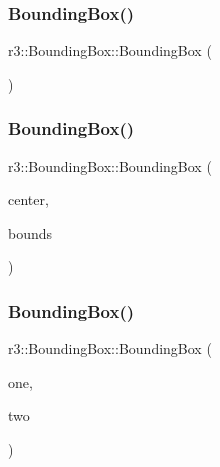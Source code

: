 \subsubsection{\texorpdfstring{Bounding\+Box()}{BoundingBox()}\hspace{0.1cm}{\footnotesize\ttfamily [1/3]}}
{\footnotesize\ttfamily r3\+::\+Bounding\+Box\+::\+Bounding\+Box (\begin{DoxyParamCaption}{ }\end{DoxyParamCaption})}

\mbox{\label{classr3_1_1_bounding_box_abb61e82e1d736772f92b4f5b519c755d}} 
\subsubsection{\texorpdfstring{Bounding\+Box()}{BoundingBox()}\hspace{0.1cm}{\footnotesize\ttfamily [2/3]}}
{\footnotesize\ttfamily r3\+::\+Bounding\+Box\+::\+Bounding\+Box (\begin{DoxyParamCaption}\item[{const glm\+::vec3 \&}]{center,  }\item[{const glm\+::vec3 \&}]{bounds }\end{DoxyParamCaption})}

\mbox{\label{classr3_1_1_bounding_box_a23750f8e74b918e0b39ce2c2fe609574}} 
\subsubsection{\texorpdfstring{Bounding\+Box()}{BoundingBox()}\hspace{0.1cm}{\footnotesize\ttfamily [3/3]}}
{\footnotesize\ttfamily r3\+::\+Bounding\+Box\+::\+Bounding\+Box (\begin{DoxyParamCaption}\item[{const \mbox{\hyperlink{classr3_1_1_bounding_box}{Bounding\+Box}} \&}]{one,  }\item[{const \mbox{\hyperlink{classr3_1_1_bounding_box}{Bounding\+Box}} \&}]{two }\end{DoxyParamCaption})}

